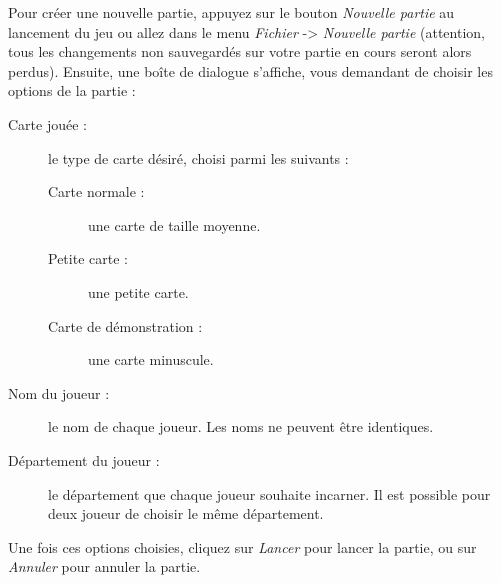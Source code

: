 Pour créer une nouvelle partie, appuyez sur le bouton \emph{Nouvelle partie} au lancement du jeu ou allez dans le menu \emph{Fichier} -> \emph{Nouvelle partie} (attention, tous les changements non sauvegardés sur votre partie en cours seront alors perdus).
Ensuite, une boîte de dialogue s'affiche, vous demandant de choisir les options de la partie :

\begin{description}
	\item[Carte jouée :] le type de carte désiré, choisi parmi les suivants :
	\begin{description}
		\item[Carte normale :] une carte de taille moyenne.
		\item[Petite carte :] une petite carte.
		\item[Carte de démonstration :] une carte minuscule.
	\end{description}

	\item[Nom du joueur :] le nom de chaque joueur. Les noms ne peuvent être identiques.

	\item[Département du joueur :] le département que chaque joueur souhaite incarner. Il est possible pour deux joueur de choisir le même département.
\end{description}

Une fois ces options choisies, cliquez sur \emph{Lancer} pour lancer la partie, ou sur \emph{Annuler} pour annuler la partie.